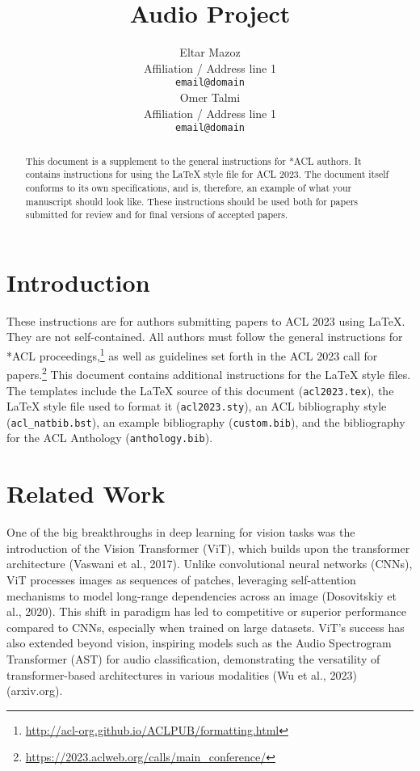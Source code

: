 \documentclass[11pt]{article}
\title{Audio Project}
\author{Eltar Mazoz \\
  Affiliation / Address line 1 \\
  \texttt{email@domain} \\\And
  Omer Talmi \\
  Affiliation / Address line 1 \\
  \texttt{email@domain} \\}
\begin{document}
\maketitle
\begin{abstract}
This document is a supplement to the general instructions for *ACL authors. It contains instructions for using the \LaTeX{} style file for ACL 2023.
The document itself conforms to its own specifications, and is, therefore, an example of what your manuscript should look like.
These instructions should be used both for papers submitted for review and for final versions of accepted papers.
\end{abstract}

\section{Introduction}

These instructions are for authors submitting papers to ACL 2023 using \LaTeX. They are not self-contained. All authors must follow the general instructions for *ACL proceedings,\footnote{\url{http://acl-org.github.io/ACLPUB/formatting.html}} as well as guidelines set forth in the ACL 2023 call for papers.\footnote{\url{https://2023.aclweb.org/calls/main_conference/}} This document contains additional instructions for the \LaTeX{} style files.
The templates include the \LaTeX{} source of this document (\texttt{acl2023.tex}),
the \LaTeX{} style file used to format it (\texttt{acl2023.sty}),
an ACL bibliography style (\texttt{acl\_natbib.bst}),
an example bibliography (\texttt{custom.bib}),
and the bibliography for the ACL Anthology (\texttt{anthology.bib}).

\section{Related Work}
One of the big breakthroughs in deep learning for vision tasks was the introduction of the Vision Transformer (ViT), which builds upon the transformer architecture (Vaswani et al., 2017). Unlike convolutional neural networks (CNNs), ViT processes images as sequences of patches, leveraging self-attention mechanisms to model long-range dependencies across an image (Dosovitskiy et al., 2020). This shift in paradigm has led to competitive or superior performance compared to CNNs, especially when trained on large datasets. ViT’s success has also extended beyond vision, inspiring models such as the Audio Spectrogram Transformer (AST) for audio classification, demonstrating the versatility of transformer-based architectures in various modalities (Wu et al., 2023) (arxiv.org).
\end{document}
